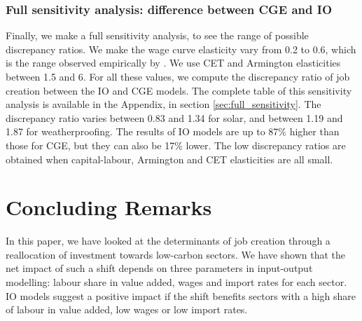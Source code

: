 \subsubsection{Full sensitivity analysis: difference between CGE and IO}
Finally, we make a full sensitivity analysis, to see the range of possible discrepancy ratios. We make the wage curve elasticity vary from 0.2 to 0.6, which is the range observed empirically by \citet{VanderWerf2008}. We use CET and Armington elasticities between 1.5 and 6. For all these values, we compute the discrepancy ratio of job creation between the IO and CGE models. 
The complete table of this sensitivity analysis is available in the Appendix, in section \ref{sec:full_sensitivity}.
The discrepancy ratio varies between 0.83 and 1.34 for solar, and between 1.19 and 1.87 for weatherproofing. The results of IO models are up to 87\% higher than those for CGE, but they can also be 17\% lower. The low discrepancy ratios are obtained when capital-labour, Armington and CET elasticities are all small.


\section{Concluding Remarks} \label{sec:conclusion}

In this paper, we have looked at the determinants of job creation through a reallocation of investment towards low-carbon sectors.
We have shown that the net impact of such a shift depends on three parameters in input-output modelling: labour share in value added, wages and import rates for each sector.
IO models suggest a positive impact if the shift benefits sectors with a high share of labour in value added, low wages or low import rates.

